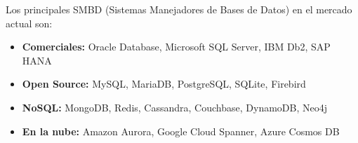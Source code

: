 \item
Los principales SMBD (Sistemas Manejadores de Bases de Datos) en el mercado actual son:

\begin{itemize}
	\item \textbf{Comerciales:} Oracle Database, Microsoft SQL Server, IBM Db2, SAP HANA
	\item \textbf{Open Source:} MySQL, MariaDB, PostgreSQL, SQLite, Firebird
	\item \textbf{NoSQL:} MongoDB, Redis, Cassandra, Couchbase, DynamoDB, Neo4j
	\item \textbf{En la nube:} Amazon Aurora, Google Cloud Spanner, Azure Cosmos DB
\end{itemize}
